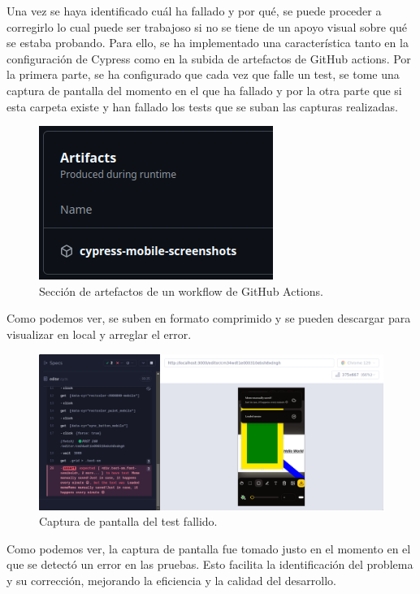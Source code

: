 Una vez se haya identificado cuál ha fallado y por qué, se puede proceder a corregirlo lo cual puede ser trabajoso si no se tiene de un apoyo visual sobre qué se estaba probando. Para ello, se ha implementado una característica tanto en la configuración de Cypress como en la subida de artefactos de GitHub actions. Por la primera parte, se ha configurado que cada vez que falle un test, se tome una captura de pantalla del momento en el que ha fallado y por la otra parte que si esta carpeta existe y han fallado los tests que se suban las capturas realizadas.

\begin{figure}[H]
    \caption{Sección de artefactos de un workflow de GitHub Actions.}
    \centering
    \vspace*{0.5cm}
    \includegraphics[scale=0.4]{figuras/artefacto.png}
\end{figure}

Como podemos ver, se suben en formato comprimido y se pueden descargar para visualizar en local y arreglar el error.

\begin{figure}[H]
    \caption{Captura de pantalla del test fallido.}
    \centering
    \vspace*{0.5cm}
    \includegraphics[scale=0.25]{figuras/test_fallado_snapshot.png}
\end{figure}

Como podemos ver, la captura de pantalla fue tomado justo en el momento en el que se detectó un error en las pruebas. Esto facilita la identificación del problema y su corrección, mejorando la eficiencia y la calidad del desarrollo.

